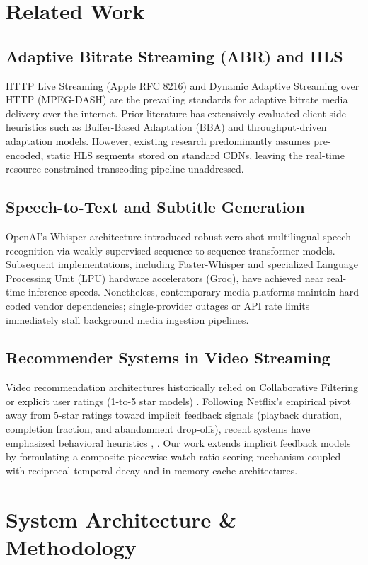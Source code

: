 \documentclass[conference]{IEEEtran}
\begin{document}
\section{Related Work}

\subsection{Adaptive Bitrate Streaming (ABR) and HLS}
HTTP Live Streaming (Apple RFC 8216) \cite{b1} and Dynamic Adaptive Streaming over HTTP (MPEG-DASH) are the prevailing standards for adaptive bitrate media delivery over the internet. Prior literature has extensively evaluated client-side heuristics such as Buffer-Based Adaptation (BBA) \cite{b2} and throughput-driven adaptation models. However, existing research predominantly assumes pre-encoded, static HLS segments stored on standard CDNs, leaving the real-time resource-constrained transcoding pipeline unaddressed.

\subsection{Speech-to-Text and Subtitle Generation}
OpenAI's Whisper architecture \cite{b3} introduced robust zero-shot multilingual speech recognition via weakly supervised sequence-to-sequence transformer models. Subsequent implementations, including Faster-Whisper and specialized Language Processing Unit (LPU) hardware accelerators (Groq), have achieved near real-time inference speeds. Nonetheless, contemporary media platforms maintain hard-coded vendor dependencies; single-provider outages or API rate limits immediately stall background media ingestion pipelines.

\subsection{Recommender Systems in Video Streaming}
Video recommendation architectures historically relied on Collaborative Filtering or explicit user ratings (1-to-5 star models) \cite{b4}. Following Netflix's empirical pivot away from 5-star ratings toward implicit feedback signals (playback duration, completion fraction, and abandonment drop-offs), recent systems have emphasized behavioral heuristics \cite{b5}, \cite{b6}. Our work extends implicit feedback models by formulating a composite piecewise watch-ratio scoring mechanism coupled with reciprocal temporal decay and in-memory cache architectures.

\section{System Architecture \& Methodology}
\end{document}
